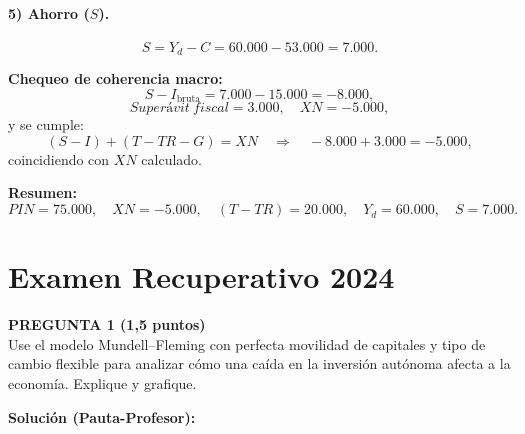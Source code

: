 \documentclass[11pt,addpoints]{article}
\begin{document}
\newpage
\vspace*{0.5cm}
\paragraph{5) Ahorro ($S$).}
\[
S = Y_d - C = 60{.}000 - 53{.}000 = 7{.}000.
\]

\medskip
\textbf{Chequeo de coherencia macro:}
\[
S - I_{\text{bruta}} = 7{.}000 - 15{.}000 = -8{.}000,
\]
\[
Superávit\ fiscal = 3{.}000,\quad XN = -5{.}000,
\]
y se cumple:
\[
(S - I) + (T - TR - G) = XN\quad
\Rightarrow\quad -8{.}000 + 3{.}000 = -5{.}000,
\]
coincidiendo con $XN$ calculado.

\medskip
\textbf{Resumen:}
\[
PIN = 75{.}000,\quad XN = -5{.}000,\quad (T - TR) = 20{.}000,\quad
Y_d = 60{.}000,\quad S = 7{.}000.
\]

\newpage
\vspace*{0.1cm}
\section*{Examen Recuperativo 2024}

\vspace{0.4cm}

\textbf{PREGUNTA 1 (1,5 puntos)}\\[0.2cm]
Use el modelo Mundell--Fleming con perfecta movilidad de capitales y tipo de cambio flexible para analizar cómo una caída en la inversión autónoma afecta a la economía. Explique y grafique.

\vspace{0.2cm}
\textbf{Solución (Pauta-Profesor):}
\end{document}

